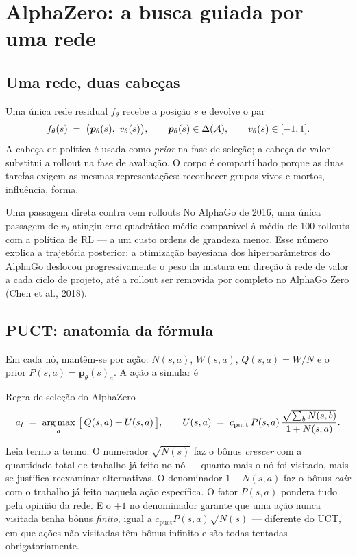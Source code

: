 \documentclass[11pt]{article}
\newcommand{\cpuct}{c_{\mathrm{puct}}}
\newcommand{\Nvis}{N}
\newcommand{\Wtot}{W}
\newcommand{\redeval}{v_{\theta}}
\newcommand{\redepol}{\bm{p}_{\theta}}
\begin{document}
\section{AlphaZero: a busca guiada por uma rede}

\subsection{Uma rede, duas cabeças}

Uma única rede residual $f_{\theta}$ recebe a posição $s$ e devolve o par
\[
  f_{\theta}(s) \;=\; \bigl(\redepol(s),\ \redeval(s)\bigr),
  \qquad \redepol(s) \in \Delta(\gA), \qquad \redeval(s) \in [-1,1].
\]
A cabeça de política é usada como \emph{prior} na fase de seleção; a cabeça de
valor substitui a rollout na fase de avaliação. O corpo é compartilhado porque as
duas tarefas exigem as mesmas representações: reconhecer grupos vivos e mortos,
influência, forma.

\begin{teobox}{Uma passagem direta contra cem rollouts}
No AlphaGo de 2016, uma única passagem de $\redeval$ atingiu erro quadrático médio
comparável à média de 100 rollouts com a política de RL — a um custo ordens de
grandeza menor. Esse número explica a trajetória posterior: a otimização bayesiana
dos hiperparâmetros do AlphaGo deslocou progressivamente o peso da mistura em
direção à rede de valor a cada ciclo de projeto, até a rollout ser removida por
completo no AlphaGo Zero (Chen et al., 2018).
\end{teobox}

\subsection{PUCT: anatomia da fórmula}

Em cada nó, mantêm-se por ação: $\Nvis(s,a)$, $\Wtot(s,a)$, $Q(s,a) = \Wtot/\Nvis$
e o prior $P(s,a) = \redepol(s)_a$. A ação a simular é

\begin{teobox}{Regra de seleção do AlphaZero}
\[
  a_t \;=\; \argmax_{a}\ \bigl[\, Q(s,a) + U(s,a) \,\bigr],
  \qquad
  U(s,a) \;=\; \cpuct\, P(s,a)\, \frac{\sqrt{\sum_b \Nvis(s,b)}}{1+\Nvis(s,a)} .
\]
\end{teobox}

Leia termo a termo. O numerador $\sqrt{\Nvis(s)}$ faz o bônus \emph{crescer} com a
quantidade total de trabalho já feito no nó — quanto mais o nó foi visitado, mais
se justifica reexaminar alternativas. O denominador $1+\Nvis(s,a)$ faz o bônus
\emph{cair} com o trabalho já feito naquela ação específica. O fator $P(s,a)$
pondera tudo pela opinião da rede. E o $+1$ no denominador garante que uma ação
nunca visitada tenha bônus \emph{finito}, igual a $\cpuct P(s,a)\sqrt{\Nvis(s)}$ —
diferente do UCT, em que ações não visitadas têm bônus infinito e são todas
tentadas obrigatoriamente.
\end{document}

